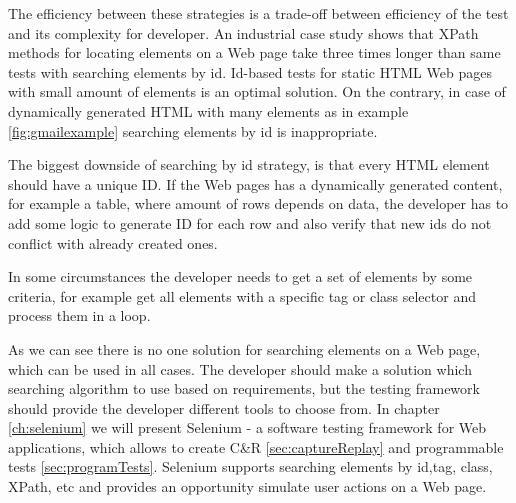 		The efficiency between these strategies is a trade-off between efficiency of
		the test and its complexity for developer. An industrial case study shows that 
		XPath methods for locating elements on a Web page take 
		three times longer than same tests with searching
    elements by id\cite{selenium4}. 
	   Id-based tests for static HTML Web pages with small amount of elements
	   is an optimal solution. On the contrary, in case of dynamically
	   generated HTML with many elements as in example \ref{fig:gmailexample}
	   searching elements by id is inappropriate.
		
		The biggest downside of searching by id strategy, is that every HTML element
		should have a unique ID. If the Web pages has a dynamically generated content,
		for example a table, where amount of rows depends on data, the
		developer has to add some logic to generate ID for each row and also verify
		that new ids do not conflict with already created ones. 
		
		In some circumstances the developer needs to get a set of elements by some
		criteria, for example get all elements with a specific tag or class selector
		and process them in a loop. 
		
		As we can see there is no one solution for searching elements on a Web page,
		which can be used in all cases. The developer should make a solution which
		searching algorithm to use based on requirements, but the testing framework
		should provide the developer different tools to choose from. In chapter
		\ref{ch:selenium} we will present Selenium - a software testing framework
		for Web applications, which allows to create C\&R \ref{sec:captureReplay} and 
    programmable tests \ref{sec:programTests}. Selenium  supports searching
    elements by id,tag, class, XPath, etc and provides an opportunity simulate
    user actions on a Web page.
		

 
